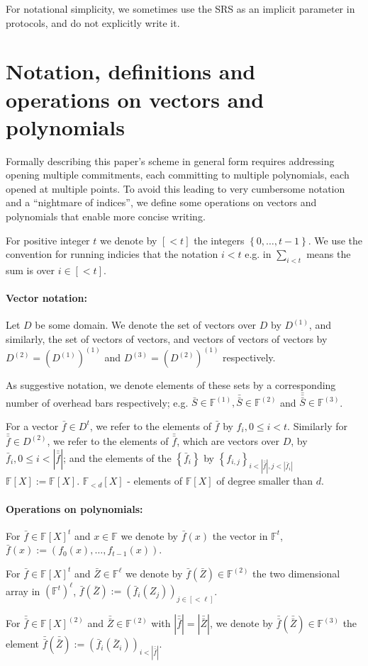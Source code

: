 \documentclass[11pt]{article} %
\newcommand{\F}{\ensuremath{\mathbb F}\xspace}
\newcommand{\vecc}[2]{\ensuremath{(#1)_{#2}}\xspace}
\newcommand{\defeq}{:=}
\newcommand{\sett}[2]{\ensuremath{\set{#1}_{#2}}\xspace}
\newcommand{\set}[1]{\ensuremath{\left\{#1\right\}}\xspace}
\newcommand{\polysofdeg}[1]{\ensuremath{\F_{< #1}[X]}\xspace}
\newcommand{\Z}{\mathbb{Z}}
\newcommand{\polys}{\ensuremath{\mathbb{F}[X]}\xspace}
\newcommand{\lt}[1]{\ensuremath{ [ {\scriptscriptstyle <} #1]}\xspace}
\newcommand{\f}{\ensuremath{\bar{f}}\xspace}
\newcommand{\ff}{\ensuremath{\bar{\bar{f}}}\xspace}
\renewcommand{\S}{\ensuremath{\bar{S}}\xspace}
\renewcommand{\Z}{\ensuremath{\bar{Z}}\xspace}
\newcommand{\ZZ}{\ensuremath{\bar{\bar{Z}}}\xspace}
\renewcommand{\SS}{\ensuremath{\bar{\bar{S}}}\xspace}
\newcommand{\SSS}{\ensuremath{\bar{\bar{\bar{S}}}}\xspace}
\newcommand{\vecs}{{\ensuremath{\F^{(1)}}}\xspace}
\newcommand{\rects}{\ensuremath{\F^{(2)}}\xspace}
\newcommand{\cubes}{\ensuremath{\F^{(3)}}\xspace}
\newcommand{\prg}[1]{ \paragraph{\textbf{#1}}}
\newcommand{\sumi}[1]{\sum_{i<#1}}
\begin{document}
For notational simplicity, we sometimes use the SRS  as an implicit parameter in protocols, and do not explicitly write it.


\section{Notation, definitions and operations on vectors and polynomials}

Formally describing this paper's scheme in general form requires addressing opening multiple commitments, each committing to multiple polynomials, each opened at multiple points.
To avoid this leading to very cumbersome notation and a ``nightmare of indices'', we define some operations on vectors and polynomials that enable more concise writing.


For positive integer $t$ we denote by \lt{t} the integers \set{0,\ldots,t-1}.
We use the convention for running indicies that the notation $i<t$ e.g. 
in $\sumi{t}$ means the sum is over $i\in \lt{t}$.

\prg{Vector notation:}
Let $D$ be some domain. We denote the set of vectors over $D$ by $D^{(1)}$, and similarly, the set of vectors of vectors, and vectors of vectors of vectors by
$D^{(2)}=(D^{(1)})^{(1)}$ and $D^{(3)}=(D^{(2)})^{(1)}$ respectively.

  As suggestive notation, we denote elements of these sets by a corresponding number of overhead bars respectively; e.g. $\S\in \vecs,\SS\in \rects$ and $\SSS\in \cubes$.
  
 For a vector $\f\in D^t$, we refer to the elements of \f by $f_i,0\leq i < t$. Similarly for $\ff\in D^{(2)}$, we refer to the elements of \ff, which are vectors over $D$,  by $\f_i, 0\leq i < |\ff|$; and the elements of the \set{\f_i} by \sett{f_{i,j}}{i< |\ff|,j<|\f_i|} $\polys\defeq \F[X]$.
$\polysofdeg{d}$ - elements of \polys of degree smaller than $d$.

\prg{Operations on polynomials:}
For $\f\in\polys^t$ and $x\in \F$ we denote by $\f(x)$ the vector in $\F^t$, $\f(x)\defeq (f_0(x),\ldots,f_{t-1}(x))$.

For $\f\in\polys^t$ and $\Z\in \F^{\ell}$ we denote by $\f(\Z)\in \rects$ the two dimensional array in $(\F^t)^{\ell}$, $\f(\Z)\defeq   \vecc{\f_i(Z_j)}{j\in \lt{\ell}}$.

For $\ff\in\polys^{(2)}$ and $\ZZ \in \rects$ with $|\ff|=|\ZZ|$,  we denote by $\ff(\ZZ)\in \cubes$ the element  $\ff(\ZZ)\defeq  \vecc{\f_i(\Z_i)}{i<|\ff|}$.
\end{document}
